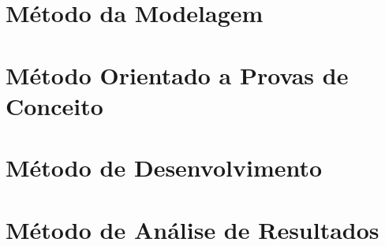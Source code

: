 
\section{Método da Modelagem}
\label{mtd-modelagem}


\section{Método Orientado a Provas de Conceito}
\label{mtd-provas-conceito}


\section{Método de Desenvolvimento}
\label{mtd-desenvolvimento}

\section{Método de Análise de Resultados}
\label{mtd-analise-resultados}

